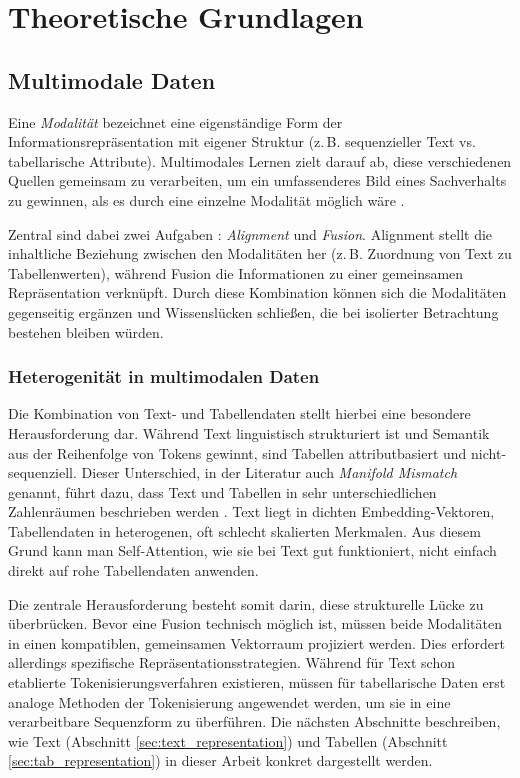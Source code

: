 \section{Theoretische Grundlagen}
\label{sec:theoretical_foundations}

\subsection{Multimodale Daten}
\label{sec:multimodal_data}

Eine \textit{Modalität} bezeichnet eine eigenständige Form der Informationsrepräsentation mit eigener Struktur (z.\,B. sequenzieller Text vs. tabellarische Attribute). Multimodales Lernen zielt darauf ab, diese verschiedenen Quellen gemeinsam zu verarbeiten, um ein umfassenderes Bild eines Sachverhalts zu gewinnen, als es durch eine einzelne Modalität möglich wäre \cite{Baltrusaitis2019}.

Zentral sind dabei zwei Aufgaben \cite{Li2024}: \textit{Alignment} und \textit{Fusion}. Alignment stellt die inhaltliche Beziehung zwischen den Modalitäten her (z.\,B. Zuordnung von Text zu Tabellenwerten), während Fusion die Informationen zu einer gemeinsamen Repräsentation verknüpft. Durch diese Kombination können sich die Modalitäten gegenseitig ergänzen und Wissenslücken schließen, die bei isolierter Betrachtung bestehen bleiben würden.

\subsubsection{Heterogenität in multimodalen Daten}
\label{sec:heterogeneity}

Die Kombination von Text- und Tabellendaten stellt hierbei eine besondere Herausforderung dar. Während Text linguistisch strukturiert ist und Semantik aus der Reihenfolge von Tokens gewinnt, sind Tabellen attributbasiert und nicht-sequenziell. Dieser Unterschied, in der Literatur auch \textit{Manifold Mismatch} genannt, führt dazu, dass Text und Tabellen in sehr unterschiedlichen Zahlenräumen beschrieben werden \cite{Baltrusaitis2019, Huang2020}. Text liegt in dichten Embedding-Vektoren, Tabellendaten in heterogenen, oft schlecht skalierten Merkmalen. Aus diesem Grund kann man Self-Attention, wie sie bei Text gut funktioniert, nicht einfach direkt auf rohe Tabellendaten anwenden.

Die zentrale Herausforderung besteht somit darin, diese strukturelle Lücke zu überbrücken. Bevor eine Fusion technisch möglich ist, müssen beide Modalitäten in einen kompatiblen, gemeinsamen Vektorraum projiziert werden. Dies erfordert allerdings spezifische Repräsentationsstrategien. Während für Text schon etablierte Tokenisierungsverfahren existieren, müssen für tabellarische Daten erst analoge Methoden der Tokenisierung angewendet werden, um sie in eine verarbeitbare Sequenzform zu überführen. Die nächsten Abschnitte beschreiben, wie Text (Abschnitt \ref{sec:text_representation}) und Tabellen (Abschnitt \ref{sec:tab_representation}) in dieser Arbeit konkret dargestellt werden.

